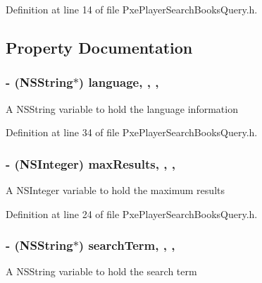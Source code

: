 Definition at line 14 of file Pxe\-Player\-Search\-Books\-Query.\-h.



\subsection{Property Documentation}
\hypertarget{interface_pxe_player_search_books_query_a46383e9d5bfcf7c45e5dd78b5bf71aea}{
\subsubsection[{language}]{\setlength{\rightskip}{0pt plus 5cm}-\/ (N\-S\-String$\ast$) language\hspace{0.3cm}{\ttfamily [read]}, {\ttfamily [write]}, {\ttfamily [nonatomic]}, {\ttfamily [strong]}}}\label{interface_pxe_player_search_books_query_a46383e9d5bfcf7c45e5dd78b5bf71aea}
A N\-S\-String variable to hold the language information 

Definition at line 34 of file Pxe\-Player\-Search\-Books\-Query.\-h.

\hypertarget{interface_pxe_player_search_books_query_aac159c61fed7fa6bb0c4a1a70a7637ce}{
\subsubsection[{max\-Results}]{\setlength{\rightskip}{0pt plus 5cm}-\/ (N\-S\-Integer) max\-Results\hspace{0.3cm}{\ttfamily [read]}, {\ttfamily [write]}, {\ttfamily [nonatomic]}, {\ttfamily [assign]}}}\label{interface_pxe_player_search_books_query_aac159c61fed7fa6bb0c4a1a70a7637ce}
A N\-S\-Integer variable to hold the maximum results 

Definition at line 24 of file Pxe\-Player\-Search\-Books\-Query.\-h.

\hypertarget{interface_pxe_player_search_books_query_a417d9bda9b205c8d5727e163bcbc0e3b}{
\subsubsection[{search\-Term}]{\setlength{\rightskip}{0pt plus 5cm}-\/ (N\-S\-String$\ast$) search\-Term\hspace{0.3cm}{\ttfamily [read]}, {\ttfamily [write]}, {\ttfamily [nonatomic]}, {\ttfamily [strong]}}}\label{interface_pxe_player_search_books_query_a417d9bda9b205c8d5727e163bcbc0e3b}
A N\-S\-String variable to hold the search term 

